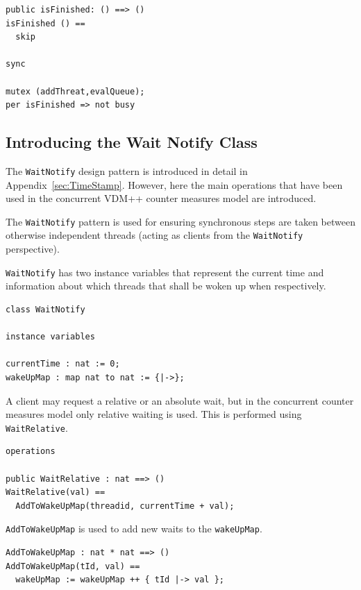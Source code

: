 \documentclass{overturerepchap}
\begin{document}
\begin{lstlisting}
public isFinished: () ==> ()
isFinished () == 
  skip

sync

mutex (addThreat,evalQueue);
per isFinished => not busy
\end{lstlisting}

\subsection{Introducing the Wait Notify Class}

The \texttt{WaitNotify} design pattern is introduced in detail in 
Appendix~\ref{sec:TimeStamp}. However, here the main operations that have
been used in the concurrent VDM++ counter measures model are introduced.

The \texttt{WaitNotify} pattern is used for ensuring synchronous steps
are taken between otherwise independent threads (acting as clients from the
\texttt{WaitNotify} perspective). 

\texttt{WaitNotify} has two instance variables that represent the current time
and information about which threads that shall be woken up when
respectively.

\begin{lstlisting}
class WaitNotify

instance variables
  
currentTime : nat := 0;
wakeUpMap : map nat to nat := {|->};
\end{lstlisting}

A client may request a relative or an absolute wait, but in the concurrent
counter measures model only relative waiting is used. This is
performed using \texttt{WaitRelative}.

\begin{lstlisting}
operations

public WaitRelative : nat ==> ()
WaitRelative(val) ==
  AddToWakeUpMap(threadid, currentTime + val);  
\end{lstlisting}

\texttt{AddToWakeUpMap} is used to add new waits to the \texttt{wakeUpMap}.

\begin{lstlisting}
AddToWakeUpMap : nat * nat ==> ()
AddToWakeUpMap(tId, val) ==
  wakeUpMap := wakeUpMap ++ { tId |-> val };
\end{lstlisting}
\end{document}

